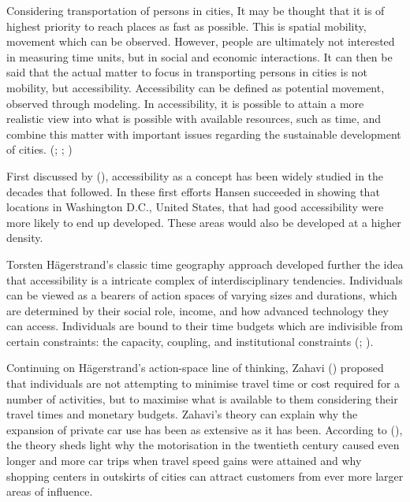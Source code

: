Considering transportation of persons in cities, It may be thought that it is of highest priority to reach places as fast as possible. This is spatial mobility, movement which can be observed. However, people are ultimately not interested in measuring time units, but in social and economic interactions. It can then be said that the actual matter to focus in transporting persons in cities is not mobility, but accessibility. Accessibility can be defined as potential movement, observed through modeling. In accessibility, it is possible to attain a more realistic view into what is possible with available resources, such as time, and combine this matter with important issues regarding the sustainable development of cities. (\cite{Hodge1997}; \cite{Tenkanen2017}; \cite{Cervero2017})

First discussed by \citeauthor{Hansen1959} (\citeyear{Hansen1959}), accessibility as a concept has been widely studied in the decades that followed. In these first efforts Hansen succeeded in showing that locations in Washington D.C., United States, that had good accessibility were more likely to end up developed. These areas would also be developed at a higher density.

Torsten Hägerstrand's classic time geography approach developed further the idea that accessibility is a intricate complex of interdisciplinary tendencies. Individuals can be viewed as a bearers of action spaces of varying sizes and durations, which are determined by their social role, income, and how advanced technology they can access. Individuals are bound to their time budgets which are indivisible from certain constraints: the capacity, coupling, and institutional constraints (\cite{Wegener1999}; \cite{Hagerstrand1970}).

Continuing on Hägerstrand's action-space line of thinking, Zahavi (\citeyear{Zahavi1974}) proposed that individuals are not attempting to minimise travel time or cost required for a number of activities, but to maximise what is available to them considering their travel times and monetary budgets. Zahavi's theory can explain why the expansion of private car use has been as extensive as it has been. According to \citeauthor{Wegener1999} (\citeyear{Wegener1999}), the theory sheds light why the motorisation in the twentieth century caused even longer and more car trips when travel speed gains were attained and why shopping centers in outskirts of cities can attract customers from ever more larger areas of influence.

